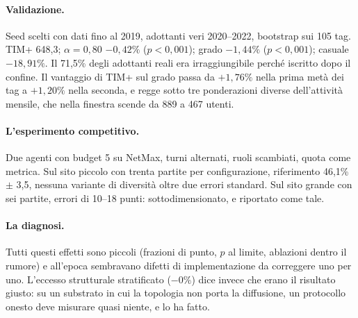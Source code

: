 \documentclass[11pt,a4paper]{article}
\begin{document}
\paragraph{Validazione.} Seed scelti con dati fino al 2019, adottanti veri 2020--2022, bootstrap sui 105 tag. TIM+ 648,3; $\alpha = 0{,}80$ $-0{,}42\%$ ($p < 0{,}001$); grado $-1{,}44\%$ ($p < 0{,}001$); casuale $-18{,}91\%$. Il 71,5\% degli adottanti reali era irraggiungibile perché iscritto dopo il confine. Il vantaggio di TIM+ sul grado passa da $+1{,}76\%$ nella prima metà dei tag a $+1{,}20\%$ nella seconda, e regge sotto tre ponderazioni diverse dell'attività mensile, che nella finestra scende da 889 a 467 utenti.

\paragraph{L'esperimento competitivo.} Due agenti con budget 5 su NetMax, turni alternati, ruoli scambiati, quota come metrica. Sul sito piccolo con trenta partite per configurazione, riferimento 46,1\% $\pm$ 3,5, nessuna variante di diversità oltre due errori standard. Sul sito grande con sei partite, errori di 10--18 punti: sottodimensionato, e riportato come tale.

\paragraph{La diagnosi.} Tutti questi effetti sono piccoli (frazioni di punto, $p$ al limite, ablazioni dentro il rumore) e all'epoca sembravano difetti di implementazione da correggere uno per uno. L'eccesso strutturale stratificato ($-0\%$) dice invece che erano il risultato giusto: su un substrato in cui la topologia non porta la diffusione, un protocollo onesto deve misurare quasi niente, e lo ha fatto.

\clearpage


\end{document}
